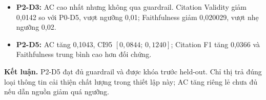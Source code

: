 \begin{itemize}
\item \textbf{P2-D3:} AC cao nhất nhưng không qua guardrail. Citation Validity giảm 0,0142 so với P0-D5, vượt ngưỡng 0,01; Faithfulness giảm 0,020029, vượt nhẹ ngưỡng 0,02.
\item \textbf{P2-D5:} AC tăng 0,1043, CI95 $[0{,}0844;\,0{,}1240]$; Citation F1 tăng 0,0366 và Faithfulness trung bình cao hơn đối chứng.
\end{itemize}

\noindent\textbf{Kết luận.} P2-D5 đạt đủ guardrail và được khóa trước held-out. Chỉ thị trả đúng loại thông tin cải thiện chất lượng trong thiết lập này; AC tăng riêng lẻ chưa đủ nếu dẫn nguồn giảm quá ngưỡng.
